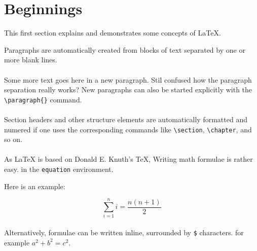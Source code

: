 \documentclass{article}
\begin{document}
\section{Beginnings}
\label{sec:beginnings}

This first section explains and demonstrates some concepts of {\LaTeX}.

Paragraphs are automatically created from blocks of text separated by one or more
blank lines.


\paragraph{} Some more text goes here in a new paragraph.
Stil confused how the paragraph separation really works?
New paragraphs can also be started explicitly with the \verb|\paragraph{}| command.



\paragraph{} Section headers and other structure elements are automatically formatted and numered
if one uses the corresponding commands like \verb|\section|, \verb|\chapter|, and
so on.


\paragraph{} As {\LaTeX} is based on Donald E. Knuth's {\TeX},
Writing math formulae is rather easy. in the \verb+equation+ environment.

Here is an example:


\begin{equation}
\label{eq:example}
\sum_{i=1}^{n}i = \frac{n(n+1)}{2}
\end{equation}

\paragraph{} Alternatively, formulae can be written inline, surrounded
by \verb|$| characters. for example $a^2 + b^2 = c^2$.
\end{document}
